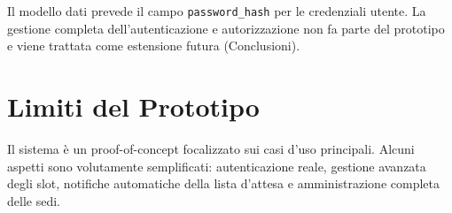 Il modello dati prevede il campo \texttt{password\_hash} per le credenziali utente. La gestione completa dell'autenticazione e autorizzazione non fa parte del prototipo e viene trattata come estensione futura (Conclusioni).

\section{Limiti del Prototipo}
Il sistema è un proof-of-concept focalizzato sui casi d'uso principali. Alcuni aspetti sono volutamente semplificati: autenticazione reale, gestione avanzata degli slot, notifiche automatiche della lista d'attesa e amministrazione completa delle sedi.